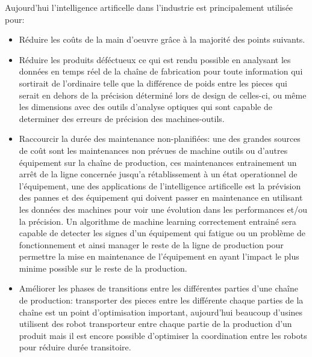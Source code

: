Aujourd'hui l'intelligence artificelle dans l'industrie est principalement utilisée pour:
\begin{itemize}
    \item Réduire les coûts de la main d'oeuvre grâce à la majorité des points suivants. \newline

    \item Réduire les produits déféctueux ce qui est rendu possible en analysant les données
    en temps réel de la chaîne de fabrication pour toute information qui sortirait de l'ordinaire 
    telle que la différence de poids entre les pieces qui serait en dehors de la précision déterminé
    lors de design de celles-ci, ou même les dimensions avec des outils d'analyse optiques qui 
    sont capable de determiner des erreurs de précision des machines-outils. \newline

    \item Raccourcir la durée des maintenance non-planifiées: une des grandes sources de coût sont les 
    maintenances non prévues de machine outils ou d'autres équipement sur la chaîne de production, ces
    maintenances entrainement un arrêt de la ligne concernée jusqu'a rétablissement à un état 
    operationnel de l'équipement, une des applications de l'intelligence artificelle est la 
    prévision des pannes et des équipement qui doivent passer en maintenance en utilisant les données
    des machines pour voir une évolution dans les performances et/ou la précision.
    Un algorithme de machine learning correctement entrainé sera capable de detecter les signes 
    d'un équipement qui fatigue ou un problème de fonctionnement et ainsi manager le reste 
    de la ligne de production pour permettre la mise en maintenance de l'équipement en ayant 
    l'impact le plus minime possible sur le reste de la production. \newline 

    \item Améliorer les phases de transitions entre les différentes parties d'une 
    chaîne de production: transporter des pieces entre les différente chaque parties 
    de la chaîne est un point d'optimisation important, aujourd'hui beaucoup d'usines
    utilisent des robot transporteur entre chaque partie de la production d'un produit
    mais il est encore possible d'optimiser la coordination entre les robots pour réduire
    durée transitoire. \newline 


\end{itemize}
